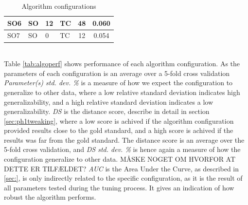 \begin{table}[h]
\begin{tabular}{| l | l | p{2cm} | p{2cm} | c | c | }
    SO6 & SO & 12 & TC & 48 & 0.060 \\\hline
    SO7 & SO & 0 & TC & 12 & 0.054 \\\hline%
%
%
  \end{tabular}
\caption{Algorithm configurations}
\label{tab:algoconfigs}
\end{table}\\
%
Table \ref{tab:algoperf} shows performance of each algorithm configuration. As the parameters of each configuration is an average over a 5-fold cross validation \textit{Parameter(s) std. dev. \%} is a measure of how we expect the configuration to generalize to other data, where a low relative standard deviation indicates high generalizability, and a high relative standard deviation indicates a low generalizability. \textit{DS} is the distance score, describe in detail in section \ref{sec:ph1tweaking}, where a low score is achived if the algorithm configuration provided results close to the gold standard, and a high score is achived if the results was far from the gold standard. The distance score is an average over the 5-fold cross validation, and \textit{DS std. dev. \%} is hence again a measure of how the configuration generalize to other data. MÅSKE NOGET OM HVORFOR AT DETTE ER TILFÆLDET? \textit{AUC} is the Area Under the Curve, as described in \ref{sec:}, is only indirectly related to the specific configuration, as it is the result of all parameters tested during the tuning process. It gives an indication of how robust the algorithm performs.
